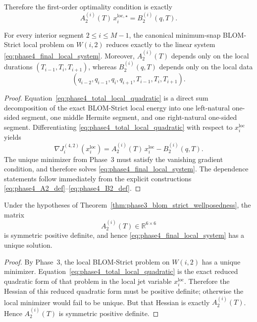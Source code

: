 Therefore the first-order optimality condition is exactly
\begin{equation}
\label{eq:phase4_final_local_system}
\boxed{
A_2^{(i)}(T)\,x_i^{\mathrm{loc},\star}
=
B_2^{(i)}(q,T).
}
\end{equation}

\begin{proposition}
\label{prop:phase4_exact_local_system}
For every interior segment \(2\le i\le M-1\), the canonical minimum-snap BLOM-Strict local problem on \(W(i,2)\) reduces exactly to the linear system \eqref{eq:phase4_final_local_system}.
Moreover, \(A_2^{(i)}(T)\) depends only on the local durations \((T_{i-1},T_i,T_{i+1})\), whereas \(B_2^{(i)}(q,T)\) depends only on the local data
\[
(q_{i-2},q_{i-1},q_i,q_{i+1},T_{i-1},T_i,T_{i+1}).
\]
\end{proposition}

\begin{proof}
Equation~\eqref{eq:phase4_total_local_quadratic} is a direct sum decomposition of the exact BLOM-Strict local energy into one left-natural one-sided segment, one middle Hermite segment, and one right-natural one-sided segment.
Differentiating \eqref{eq:phase4_total_local_quadratic} with respect to \(x_i^{\mathrm{loc}}\) yields
\[
\nabla J_i^{(4,2)}(x_i^{\mathrm{loc}})
=
A_2^{(i)}(T)\,x_i^{\mathrm{loc}}-B_2^{(i)}(q,T).
\]
The unique minimizer from Phase~3 must satisfy the vanishing gradient condition, and therefore solves \eqref{eq:phase4_final_local_system}.
The dependence statements follow immediately from the explicit constructions \eqref{eq:phase4_A2_def}--\eqref{eq:phase4_B2_def}.
\end{proof}

\begin{proposition}
\label{prop:phase4_A2_nonsingular}
Under the hypotheses of Theorem~\ref{thm:phase3_blom_strict_wellposedness}, the matrix
\[
A_2^{(i)}(T)\in\mathbb R^{6\times 6}
\]
is symmetric positive definite, and hence \eqref{eq:phase4_final_local_system} has a unique solution.
\end{proposition}

\begin{proof}
By Phase~3, the local BLOM-Strict problem on \(W(i,2)\) has a unique minimizer.
Equation~\eqref{eq:phase4_total_local_quadratic} is the exact reduced quadratic form of that problem in the local jet variable \(x_i^{\mathrm{loc}}\).
Therefore the Hessian of this reduced quadratic form must be positive definite; otherwise the local minimizer would fail to be unique.
But that Hessian is exactly \(A_2^{(i)}(T)\).
Hence \(A_2^{(i)}(T)\) is symmetric positive definite.
\end{proof}

